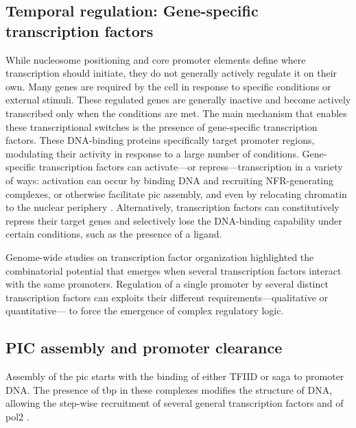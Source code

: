 \subsection{Temporal regulation: Gene-specific transcription factors}
While nucleosome positioning and core promoter elements define where transcription should initiate, they do not generally actively regulate it on their own.  
Many genes are required by the cell in response to specific conditions or external stimuli.
These regulated genes are generally inactive and become actively transcribed only when the conditions are met.
The main mechanism that enables these transcriptional switches is the presence of gene-specific transcription factors.
These DNA-binding proteins specifically target promoter regions, modulating their activity in response to a large number of conditions.
Gene-specific transcription factors can activate---or repress---transcription in a variety of ways: activation can occur by binding DNA and recruiting NFR-generating complexes, or otherwise facilitate \gls{pic} assembly, and even by relocating chromatin to the nuclear periphery \citep{randisehinchliff:2016:transcription}.
Alternatively, transcription factors can constitutively repress their target genes and selectively lose the DNA-binding capability under certain conditions, such as the presence of a ligand.

Genome-wide studies on transcription factor organization highlighted the combinatorial potential that emerges when several transcription factors interact with the same promoters\cite{harbison:2004:transcriptional}.
Regulation of a single promoter by several distinct transcription factors can exploits their different requirements---qualitative or quantitative--- to force the emergence of complex regulatory logic.

\subsection{PIC assembly and promoter clearance}
Assembly of the \acrlong{pic} starts with the binding of either TFIID or \gls{saga} to promoter DNA.
The presence of \gls{tbp} in these complexes modifies the structure of DNA, allowing the step-wise recruitment of several general transcription factors and of \gls{pol2} \citep[For review see][]{sainsbury:2015:structural}.

